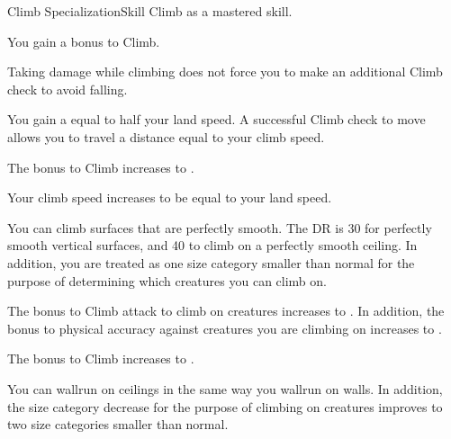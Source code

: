    \begin{feat}{Climb Specialization}{Skill}
        \featpre Climb as a mastered skill.

         You gain a  bonus to Climb.

         Taking damage while climbing does not force you to make an additional Climb check to avoid falling.

         You gain a  equal to half your land speed.
        A successful Climb check to move allows you to travel a distance equal to your climb speed.


         The bonus to Climb increases to .

         Your climb speed increases to be equal to your land speed.

         You can climb surfaces that are perfectly smooth.
        The DR is 30 for perfectly smooth vertical surfaces, and 40 to climb on a perfectly smooth ceiling.
        In addition, you are treated as one size category smaller than normal for the purpose of determining which creatures you can climb on.

         The bonus to Climb attack to climb on creatures increases to .
        In addition, the bonus to physical accuracy against creatures you are climbing on increases to .

         The bonus to Climb increases to .

         You can wallrun on ceilings in the same way you wallrun on walls.
        In addition, the size category decrease for the purpose of climbing on creatures improves to two size categories smaller than normal.
    \end{feat}


